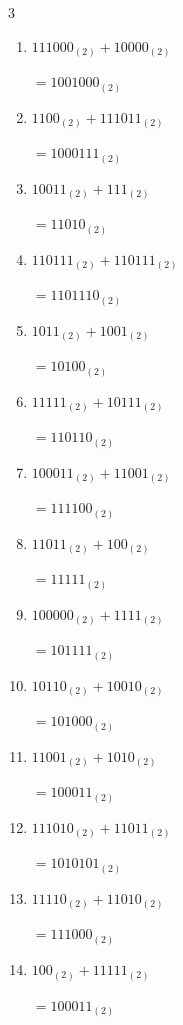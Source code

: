 \begin{multicols}{3}
\begin{enumerate}
  \item $111000_{(2)} + 10000_{(2)}$

        $=1001000_{(2)}$

  \item $1100_{(2)} + 111011_{(2)}$

        $=1000111_{(2)}$

  \item $10011_{(2)} + 111_{(2)}$

        $=11010_{(2)}$

  \item $110111_{(2)} + 110111_{(2)}$

        $=1101110_{(2)}$

\columnbreak %

\resetques

  \item $1011_{(2)} + 1001_{(2)}$

        $=10100_{(2)}$

  \item $11111_{(2)} + 10111_{(2)}$

        $=110110_{(2)}$

  \item $100011_{(2)} + 11001_{(2)}$

        $=111100_{(2)}$

  \item $11011_{(2)} + 100_{(2)}$

        $=11111_{(2)}$

  \item $100000_{(2)} + 1111_{(2)}$

        $=101111_{(2)}$

  \item $10110_{(2)} + 10010_{(2)}$

        $=101000_{(2)}$

  \item $11001_{(2)} + 1010_{(2)}$

        $=100011_{(2)}$

  \item $111010_{(2)} + 11011_{(2)}$

        $=1010101_{(2)}$

  \item $11110_{(2)} + 11010_{(2)}$

        $=111000_{(2)}$

  \item $100_{(2)} + 11111_{(2)}$

        $=100011_{(2)}$


\end{enumerate}
\end{multicols}
